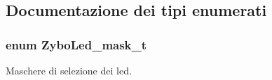 \subsection{Documentazione dei tipi enumerati}
\hypertarget{group___zybo_led_gad11701cccac394f7e1f90de8f85695f3}{
\subsubsection[{Zybo\+Led\+\_\+mask\+\_\+t}]{\setlength{\rightskip}{0pt plus 5cm}enum {\bf Zybo\+Led\+\_\+mask\+\_\+t}}}\label{group___zybo_led_gad11701cccac394f7e1f90de8f85695f3}


Maschere di selezione dei led. 

